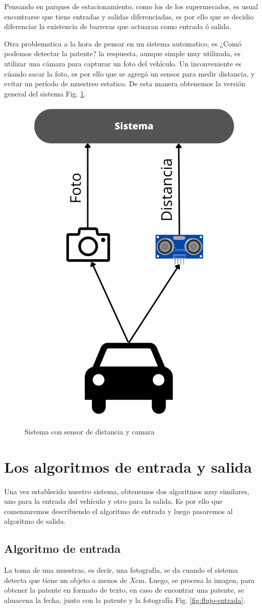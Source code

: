 Pensando en parques de estacionamiento, como los de los supermecados, es usual encontrarse que tiene entradas y salidas diferenciadas, es por ello que se decidio diferenciar la existencia de barreras que actuaran como entrada ó salida.

Otra problematica a la hora de pensar en un sistema automatico, es ¿Comó podemos detectar la patente? la respuesta, aunque simple muy utilizada, es utilizar una cámara para capturar un foto del vehículo. Un inconveniente es cúando sacar la foto, es por ello que se agregó un sensor para medir distancia, y evitar un período de muestreo estatico. De esta manera obtenemos la versión general del sistema Fig. \ref{fig:sistema-completa}.

\begin{figure}
    \centering
    \includegraphics[width=.3\textwidth]{imgs/sistema-con-sensor.png}
    \caption{Sistema con sensor de distancia y camara}
    \label{fig:sistema-completa}
\end{figure}

\section{Los algoritmos de entrada y salida}

Una vez establecido nuestro sistema, obtenemos dos algoritmos muy similares, uno para la entrada del vehículo y otro para la salida. Es por ello que comenzaremos describiendo el algoritmo de entrada y luego pasaremos al algoritmo de salida.

\subsection{Algoritmo de entrada}

La toma de una muestras, es decir, una fotografía, se da cuando el sistema detecta que tiene un objeto a menos de $X$cm. Luego, se procesa la imagen, para obtener la patente en formato de texto, en caso de encontrar una patente, se almacena la fecha, junto con la patente y la fotografía Fig. \ref{fig:flujo-entrada}.

